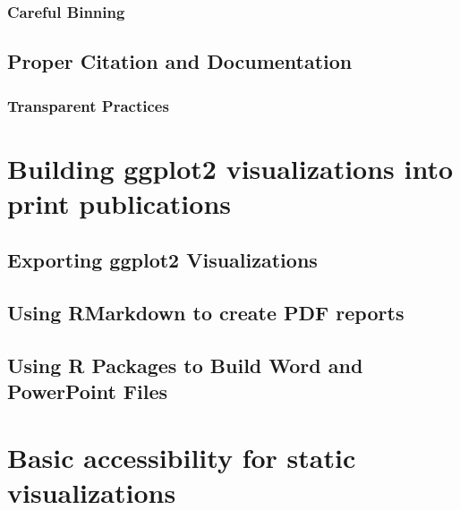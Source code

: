 \documentclass[
]{krantz}
\begin{document}
\hypertarget{careful-binning}{%
\subsection{Careful Binning}\label{careful-binning}}

\hypertarget{proper-citation-and-documentation}{%
\section{Proper Citation and Documentation}\label{proper-citation-and-documentation}}

\hypertarget{transparent-practices}{%
\subsection{Transparent Practices}\label{transparent-practices}}

\hypertarget{print-publications}{%
\chapter{Building ggplot2 visualizations into print publications}\label{print-publications}}

\hypertarget{exporting-ggplot2-visualizations}{%
\section{Exporting ggplot2 Visualizations}\label{exporting-ggplot2-visualizations}}

\hypertarget{using-rmarkdown-to-create-pdf-reports}{%
\section{Using RMarkdown to create PDF reports}\label{using-rmarkdown-to-create-pdf-reports}}

\hypertarget{using-r-packages-to-build-word-and-powerpoint-files}{%
\section{Using R Packages to Build Word and PowerPoint Files}\label{using-r-packages-to-build-word-and-powerpoint-files}}

\hypertarget{accessibility-for-visualizations}{%
\chapter{Basic accessibility for static visualizations}\label{accessibility-for-visualizations}}
\end{document}
